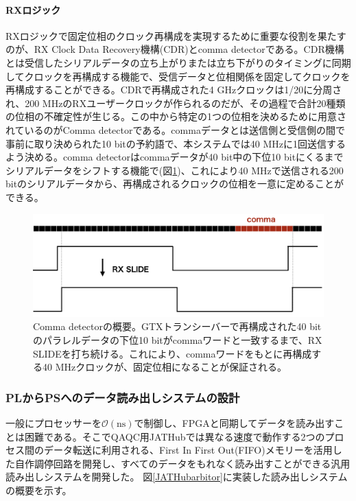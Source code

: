 \paragraph{RXロジック} \par
RXロジックで固定位相のクロック再構成を実現するために重要な役割を果たすのが、RX Clock Data Recovery機構(CDR)とcomma detectorである。CDR機構とは受信したシリアルデータの立ち上がりまたは立ち下がりのタイミングに同期してクロックを再構成する機能で、受信データと位相関係を固定してクロックを再構成することができる。CDRで再構成された4 GHzクロックは1/20に分周され、200 MHzのRXユーザークロックが作られるのだが、その過程で合計20種類の位相の不確定性が生じる。この中から特定の1つの位相を決めるために用意されているのがComma detectorである。commaデータとは送信側と受信側の間で事前に取り決められた10 bitの予約語で、本システムでは40 MHzに1回送信するよう決める。comma detectorはcommaデータが40 bit中の下位10 bitにくるまでシリアルデータをシフトする機能で(図\ref{JATHubcomma})、これにより40 MHzで送信される200 bitのシリアルデータから、再構成されるクロックの位相を一意に定めることができる。

\begin{figure} 
\centering
\includegraphics[width=16cm]{fig/QAQC/JATHubcomma.png}
\caption[Comma detectorの概要]{Comma detectorの概要。GTXトランシーバーで再構成された40 bitのパラレルデータの下位10 bitがcommaワードと一致するまで、RX SLIDEを打ち続ける。これにより、commaワードをもとに再構成する40 MHzクロックが、固定位相になることが保証される。}
\label{JATHubcomma}
\end{figure}
\baselineskip


\subsubsection{PLからPSへのデータ読み出しシステムの設計}
\baselineskip
\label{subsubsec_readout}

一般にプロセッサーを$\mathcal{O}(\mathrm{ns})$で制御し、FPGAと同期してデータを読み出すことは困難である。そこでQAQC用JATHubでは異なる速度で動作する2つのプロセス間のデータ転送に利用される、First In First Out(FIFO)メモリーを活用した自作調停回路を開発し、すべてのデータをもれなく読み出すことができる汎用読み出しシステムを開発した。
図\ref{JATHubarbitor}に実装した読み出しシステムの概要を示す。

